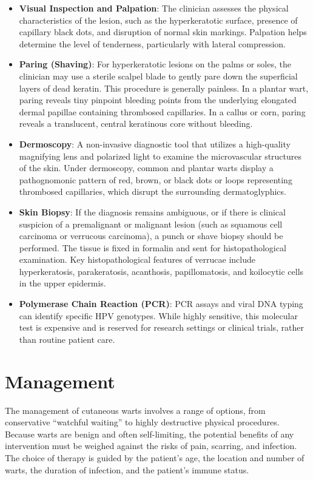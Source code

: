 \begin{itemize}
    \item \textbf{Visual Inspection and Palpation}: The clinician assesses the physical characteristics of the lesion, such as the hyperkeratotic surface, presence of capillary black dots, and disruption of normal skin markings. Palpation helps determine the level of tenderness, particularly with lateral compression.
    \item \textbf{Paring (Shaving)}: For hyperkeratotic lesions on the palms or soles, the clinician may use a sterile scalpel blade to gently pare down the superficial layers of dead keratin. This procedure is generally painless. In a plantar wart, paring reveals tiny pinpoint bleeding points from the underlying elongated dermal papillae containing thrombosed capillaries. In a callus or corn, paring reveals a translucent, central keratinous core without bleeding.
    \item \textbf{Dermoscopy}: A non-invasive diagnostic tool that utilizes a high-quality magnifying lens and polarized light to examine the microvascular structures of the skin. Under dermoscopy, common and plantar warts display a pathognomonic pattern of red, brown, or black dots or loops representing thrombosed capillaries, which disrupt the surrounding dermatoglyphics.
    \item \textbf{Skin Biopsy}: If the diagnosis remains ambiguous, or if there is clinical suspicion of a premalignant or malignant lesion (such as squamous cell carcinoma or verrucous carcinoma), a punch or shave biopsy should be performed. The tissue is fixed in formalin and sent for histopathological examination. Key histopathological features of verrucae include hyperkeratosis, parakeratosis, acanthosis, papillomatosis, and koilocytic cells in the upper epidermis.
    \item \textbf{Polymerase Chain Reaction (PCR)}: PCR assays and viral DNA typing can identify specific HPV genotypes. While highly sensitive, this molecular test is expensive and is reserved for research settings or clinical trials, rather than routine patient care.
\end{itemize}

\section*{Management}
The management of cutaneous warts involves a range of options, from conservative ``watchful waiting'' to highly destructive physical procedures. Because warts are benign and often self-limiting, the potential benefits of any intervention must be weighed against the risks of pain, scarring, and infection. The choice of therapy is guided by the patient's age, the location and number of warts, the duration of infection, and the patient's immune status.

